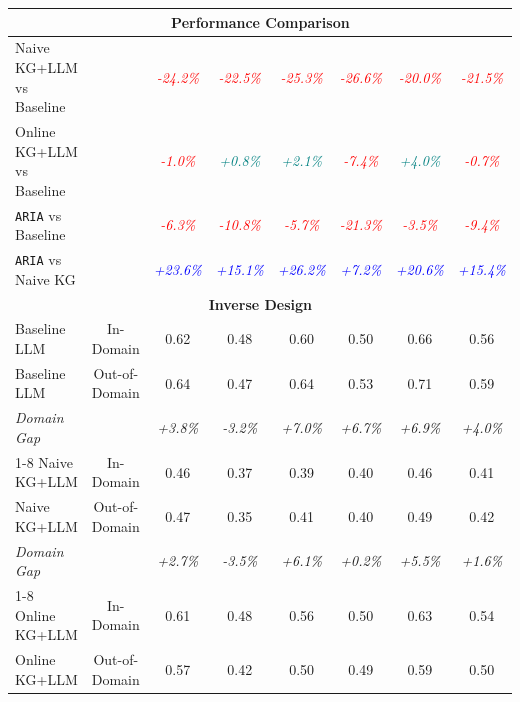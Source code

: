 \begin{table}[ht!]
{\begin{tabular}{lccccccc}
\midrule
\multicolumn{8}{c}{\textbf{Performance Comparison}} \\
\midrule
Naive KG+LLM vs Baseline & & \textcolor{red}{\textit{-24.2\%}} & \textcolor{red}{\textit{-22.5\%}} & \textcolor{red}{\textit{-25.3\%}} & \textcolor{red}{\textit{-26.6\%}} & \textcolor{red}{\textit{-20.0\%}} & \textcolor{red}{\textit{-21.5\%}} \\
Online KG+LLM vs Baseline & & \textcolor{red}{\textit{-1.0\%}} & \textcolor{teal}{\textit{+0.8\%}} & \textcolor{teal}{\textit{+2.1\%}} & \textcolor{red}{\textit{-7.4\%}} & \textcolor{teal}{\textit{+4.0\%}} & \textcolor{red}{\textit{-0.7\%}} \\
\texttt{ARIA} vs Baseline & & \textcolor{red}{\textit{-6.3\%}} & \textcolor{red}{\textit{-10.8\%}} & \textcolor{red}{\textit{-5.7\%}} & \textcolor{red}{\textit{-21.3\%}} & \textcolor{red}{\textit{-3.5\%}} & \textcolor{red}{\textit{-9.4\%}} \\
\texttt{ARIA} vs Naive KG & & \textcolor{blue}{\textit{+23.6\%}} & \textcolor{blue}{\textit{+15.1\%}} & \textcolor{blue}{\textit{+26.2\%}} & \textcolor{blue}{\textit{+7.2\%}} & \textcolor{blue}{\textit{+20.6\%}} & \textcolor{blue}{\textit{+15.4\%}} \\
\midrule
\multicolumn{8}{c}{\textbf{Inverse Design}} \\
\midrule
Baseline LLM & In-Domain & 0.62 & 0.48 & 0.60 & 0.50 & 0.66 & 0.56 \\
Baseline LLM & Out-of-Domain & 0.64 & 0.47 & 0.64 & 0.53 & 0.71 & 0.59 \\
\textit{Domain Gap} & & \textit{+3.8\%} & \textit{-3.2\%} & \textit{+7.0\%} & \textit{+6.7\%} & \textit{+6.9\%} & \textit{+4.0\%} \\
\cmidrule{1-8}
Naive KG+LLM & In-Domain & 0.46 & 0.37 & 0.39 & 0.40 & 0.46 & 0.41 \\
Naive KG+LLM & Out-of-Domain & 0.47 & 0.35 & 0.41 & 0.40 & 0.49 & 0.42 \\
\textit{Domain Gap} & & \textit{+2.7\%} & \textit{-3.5\%} & \textit{+6.1\%} & \textit{+0.2\%} & \textit{+5.5\%} & \textit{+1.6\%} \\
\cmidrule{1-8}
Online KG+LLM & In-Domain & 0.61 & 0.48 & 0.56 & 0.50 & 0.63 & 0.54 \\
Online KG+LLM & Out-of-Domain & 0.57 & 0.42 & 0.50 & 0.49 & 0.59 & 0.50 \\

\end{tabular}}
\end{table}
